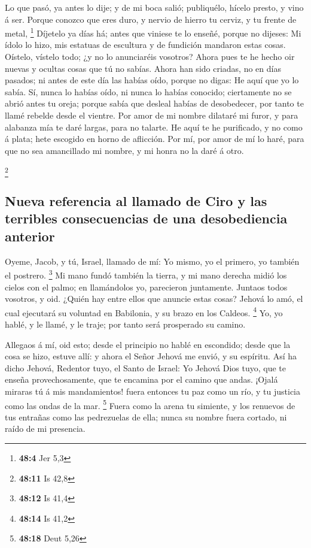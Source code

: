  Lo que pasó, ya antes lo dije; y de mi boca salió;
publiquélo, hícelo presto, y vino á ser.  Porque conozco
que eres duro, y nervio de hierro tu cerviz, y tu frente de metal,
\footnote{\textbf{48:4} Jer 5,3}  Díjetelo ya días há;
antes que viniese te lo enseñé, porque no dijeses: Mi ídolo lo hizo, mis
estatuas de escultura y de fundición mandaron estas cosas.
 Oístelo, vístelo todo; ¿y no lo anunciaréis vosotros?
Ahora pues te he hecho oir nuevas y ocultas cosas que tú no sabías.
 Ahora han sido criadas, no en días pasados; ni antes de
este día las habías oído, porque no digas: He aquí que yo lo sabía.
 Sí, nunca lo habías oído, ni nunca lo habías conocido;
ciertamente no se abrió antes tu oreja; porque sabía que desleal habías
de desobedecer, por tanto te llamé rebelde desde el vientre.
 Por amor de mi nombre dilataré mi furor, y para alabanza
mía te daré largas, para no talarte.  He aquí te he
purificado, y no como á plata; hete escogido en horno de aflicción.
 Por mí, por amor de mí lo haré, para que no sea
amancillado mi nombre, y mi honra no la daré á otro.

\footnote{\textbf{48:11} Is 42,8}

\hypertarget{nueva-referencia-al-llamado-de-ciro-y-las-terribles-consecuencias-de-una-desobediencia-anterior}{%
\subsection{Nueva referencia al llamado de Ciro y las terribles
consecuencias de una desobediencia
anterior}\label{nueva-referencia-al-llamado-de-ciro-y-las-terribles-consecuencias-de-una-desobediencia-anterior}}

 Oyeme, Jacob, y tú, Israel, llamado de mí: Yo mismo, yo
el primero, yo también el postrero. \footnote{\textbf{48:12} Is 41,4}
 Mi mano fundó también la tierra, y mi mano derecha midió
los cielos con el palmo; en llamándolos yo, parecieron juntamente.
 Juntaos todos vosotros, y oid. ¿Quién hay entre ellos
que anuncie estas cosas? Jehová lo amó, el cual ejecutará su voluntad en
Babilonia, y su brazo en los Caldeos. \footnote{\textbf{48:14} Is 41,2}
 Yo, yo hablé, y le llamé, y le traje; por tanto será
prosperado su camino.

 Allegaos á mí, oid esto; desde el principio no hablé en
escondido; desde que la cosa se hizo, estuve allí: y ahora el Señor
Jehová me envió, y su espíritu.  Así ha dicho Jehová,
Redentor tuyo, el Santo de Israel: Yo Jehová Dios tuyo, que te enseña
provechosamente, que te encamina por el camino que andas.
 ¡Ojalá miraras tú á mis mandamientos! fuera entonces tu
paz como un río, y tu justicia como las ondas de la mar. \footnote{\textbf{48:18}
  Deut 5,26}  Fuera como la arena tu simiente, y los
renuevos de tus entrañas como las pedrezuelas de ella; nunca su nombre
fuera cortado, ni raído de mi presencia.

